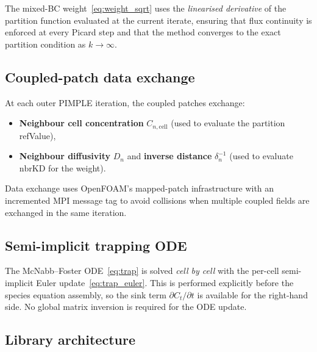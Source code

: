 \documentclass[11pt,a4paper]{article}
\begin{document}
The mixed-BC weight~\eqref{eq:weight_sqrt} uses the \emph{linearised
derivative} of the partition function evaluated at the current iterate,
ensuring that flux continuity is enforced at every Picard step and that the
method converges to the exact partition condition as $k \to \infty$.

\subsection{Coupled-patch data exchange}

At each outer PIMPLE iteration, the coupled patches exchange:
\begin{itemize}[itemsep=2pt]
  \item \textbf{Neighbour cell concentration} $C_{n,\text{cell}}$
        (used to evaluate the partition refValue),
  \item \textbf{Neighbour diffusivity} $D_n$ and
        \textbf{inverse distance} $\delta_n^{-1}$
        (used to evaluate $\text{nbrKD}$ for the weight).
\end{itemize}
Data exchange uses OpenFOAM's mapped-patch infrastructure with an incremented
MPI message tag to avoid collisions when multiple coupled fields are
exchanged in the same iteration.

\subsection{Semi-implicit trapping ODE}

The McNabb--Foster ODE~\eqref{eq:trap} is solved \emph{cell by cell} with the
per-cell semi-implicit Euler update~\eqref{eq:trap_euler}.  This is performed
explicitly before the species equation assembly, so the sink term
$\partial C_t/\partial t$ is available for the right-hand side.  No global
matrix inversion is required for the ODE update.

\subsection{Library architecture}
\end{document}
